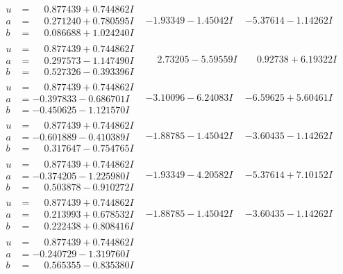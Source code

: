 \documentclass[1p]{elsarticle_modified}
\theoremstyle{definition}
\begin{document}
$$\begin{array}{c|c|c}
\begin{aligned}
u &= \phantom{-}0.877439 + 0.744862 I \\
a &= \phantom{-}0.271240 + 0.780595 I \\
b &= \phantom{-}0.086688 + 1.024240 I\end{aligned}
 & -1.93349 - 1.45042 I & -5.37614 - 1.14262 I \\ \hline\begin{aligned}
u &= \phantom{-}0.877439 + 0.744862 I \\
a &= \phantom{-}0.297573 - 1.147490 I \\
b &= \phantom{-}0.527326 - 0.393396 I\end{aligned}
 & \phantom{-}2.73205 - 5.59559 I & \phantom{-}0.92738 + 6.19322 I \\ \hline\begin{aligned}
u &= \phantom{-}0.877439 + 0.744862 I \\
a &= -0.397833 - 0.686701 I \\
b &= -0.450625 - 1.121570 I\end{aligned}
 & -3.10096 - 6.24083 I & -6.59625 + 5.60461 I \\ \hline\begin{aligned}
u &= \phantom{-}0.877439 + 0.744862 I \\
a &= -0.601889 - 0.410389 I \\
b &= \phantom{-}0.317647 - 0.754765 I\end{aligned}
 & -1.88785 - 1.45042 I & -3.60435 - 1.14262 I \\ \hline\begin{aligned}
u &= \phantom{-}0.877439 + 0.744862 I \\
a &= -0.374205 - 1.225980 I \\
b &= \phantom{-}0.503878 - 0.910272 I\end{aligned}
 & -1.93349 - 4.20582 I & -5.37614 + 7.10152 I \\ \hline\begin{aligned}
u &= \phantom{-}0.877439 + 0.744862 I \\
a &= \phantom{-}0.213993 + 0.678532 I \\
b &= \phantom{-}0.222438 + 0.808416 I\end{aligned}
 & -1.88785 - 1.45042 I & -3.60435 - 1.14262 I \\ \hline\begin{aligned}
u &= \phantom{-}0.877439 + 0.744862 I \\
a &= -0.240729 - 1.319760 I \\
b &= \phantom{-}0.565355 - 0.835380 I\end{aligned}

\end{array}$$
\end{document}
